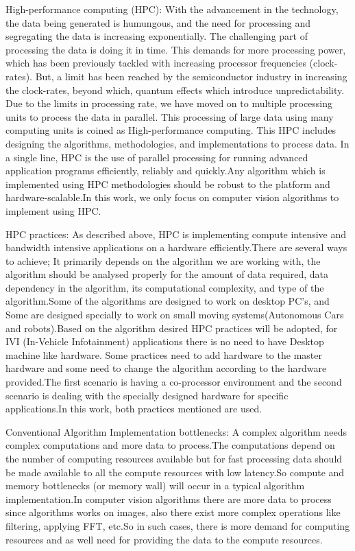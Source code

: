 High-performance computing (HPC):
With the advancement in the technology, the data being generated is humungous, and the need for processing and segregating the data is increasing exponentially. The challenging part of processing the data is doing it in time. This demands for more processing power, which has been previously tackled with increasing processor frequencies (clock-rates). But, a limit has been reached by the semiconductor industry in increasing the clock-rates, beyond which, quantum effects which introduce unpredictability. Due to the limits in processing rate, we have moved on to multiple processing units to process the data in parallel. This processing of large data using many computing units is coined as High-performance computing. This HPC includes designing the algorithms, methodologies, and implementations to process data.
    In a single line, HPC is the use of parallel processing for running advanced application programs efficiently, reliably and quickly.Any algorithm which is implemented using HPC methodologies should be robust to the platform and hardware-scalable.In this work, we only focus on computer vision algorithms to implement using HPC.

HPC practices:
As described above, HPC is implementing compute intensive and bandwidth intensive applications on a hardware efficiently.There are several ways to achieve; It primarily depends on the algorithm we are working with, the algorithm should be analysed properly for the amount of data required, data dependency in the algorithm, its computational complexity, and type of the algorithm.Some of the algorithms are designed to work on desktop PC's, and Some are designed specially to work on small moving systems(Autonomous Cars and robots).Based on the algorithm desired HPC practices will be adopted, for IVI (In-Vehicle Infotainment) applications there is no need to have Desktop machine like hardware.
    Some practices need to add hardware to the master hardware and some need to change the algorithm according to the hardware provided.The first scenario is having a co-processor environment and the second scenario is dealing with the specially designed hardware for specific applications.In this work, both practices mentioned are used.

Conventional Algorithm Implementation bottlenecks:
A complex algorithm needs complex computations and more data to process.The computations depend on the number of computing resources available but for fast processing data should be made available to all the compute resources with low latency.So compute and memory bottlenecks (or memory wall) will occur in a typical algorithm implementation.In computer vision algorithms there are more data to process since algorithms works on images, also there exist more complex operations like filtering, applying FFT, etc.So in such cases, there is more demand for computing resources and as well need for providing the data to the compute resources.

